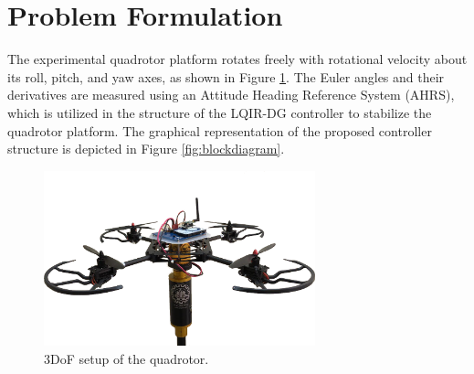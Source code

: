 \documentclass[3p,times]{elsarticle}
\begin{document}
\section{Problem Formulation}\label{sec:problem}
\noindent The experimental quadrotor platform rotates freely with rotational velocity about its roll, pitch, and yaw axes, as shown in Figure \ref{fig:quadrotor}. The Euler angles and their derivatives are measured using an Attitude Heading Reference System (AHRS), which is utilized in the structure of the LQIR-DG controller to stabilize the quadrotor platform.
The graphical representation of the proposed controller structure is depicted in Figure \ref{fig:blockdiagram}.
\begin{figure}[H]
   \centering
   \includegraphics[width=0.7\textwidth]{../Figure/3DOFQuad.png}
   \caption{3DoF setup of the quadrotor.}
   \label{fig:quadrotor}
\end{figure}
\end{document}
